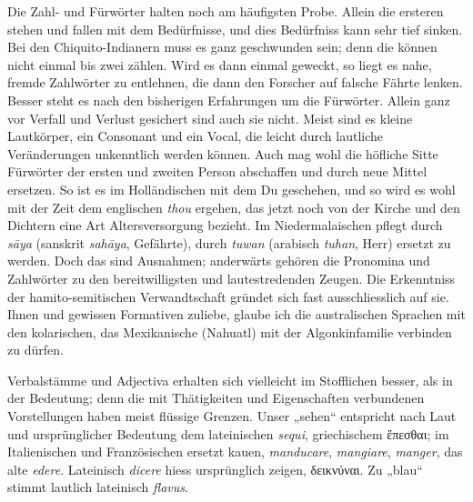 Die Zahl- und Fürwörter halten noch am häufigsten Probe. Allein die ersteren stehen und fallen mit dem Bedürfnisse, und dies Bedürfniss kann sehr tief sinken. Bei den Chiquito-Indianern muss es ganz geschwunden sein; denn die können nicht einmal bis zwei zählen. Wird es dann einmal geweckt, so liegt es nahe, fremde Zahlwörter zu entlehnen, die dann den Forscher auf falsche Fährte lenken. Besser steht es nach den bisherigen Erfahrungen um die Fürwörter. Allein ganz vor Verfall und Verlust gesichert sind auch sie nicht. Meist sind es kleine Lautkörper, ein Consonant und ein Vocal, die leicht durch lautliche Veränderungen unkenntlich werden können. Auch mag wohl die höfliche Sitte Fürwörter der ersten und zweiten Person abschaffen und durch neue Mittel ersetzen. So ist es im Holländischen mit dem Du geschehen, und so wird es wohl mit der Zeit dem englischen \textit{thou} ergehen, das jetzt noch von der Kirche und den Dichtern eine Art Altersversorgung bezieht. Im Niedermalaischen pflegt  durch \textit{sāya} (sanskrit \textit{sahāya}, Gefährte),  durch \textit{tuwan} (arabisch \textit{tuhan}, Herr) ersetzt zu werden. Doch das sind Ausnahmen; anderwärts gehören die Pronomina und Zahlwörter zu den bereitwilligsten und lautestredenden Zeugen. Die Erkenntniss der hamito-semitischen Verwandtschaft gründet sich fast ausschliesslich auf sie. Ihnen und gewissen Formativen zuliebe, glaube ich die australischen Sprachen mit den kolarischen, das Mexikanische (Nahuatl) mit der Algonkinfamilie verbinden zu dürfen.

Verbalstämme und Adjectiva erhalten sich vielleicht im Stofflichen besser, als in der Bedeutung; denn die mit Thätigkeiten und Eigenschaften verbundenen Vorstellungen haben meist flüssige Grenzen. Unser „sehen“ entspricht nach Laut \label{sp.153} und ursprünglicher Bedeutung dem lateinischen \textit{sequi}, griechischem ἕπεσθαι; im Italienischen und Französischen ersetzt kauen, \textit{manducare}, \textit{mangiare}, \textit{manger}, das alte \textit{edere}. Lateinisch \textit{dicere} hiess ursprünglich zeigen, δεικνύναι. Zu  „blau“ stimmt lautlich lateinisch \textit{flavus}.


